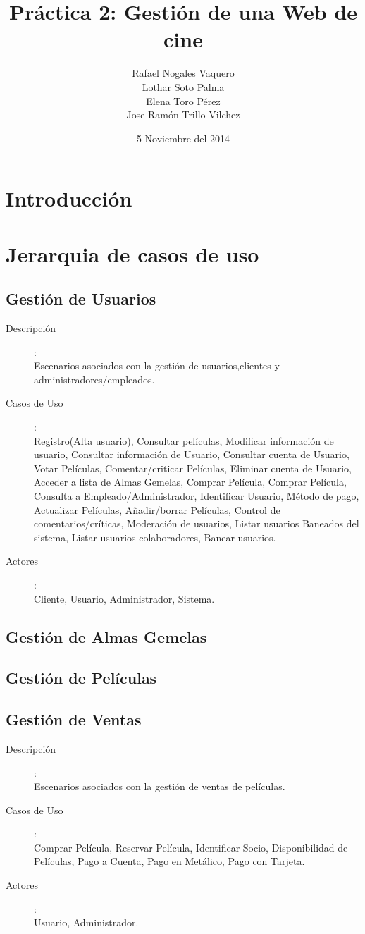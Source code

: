 \documentclass{article}
\title{Práctica 2: Gestión de una Web de cine}
\author{Rafael Nogales Vaquero
\\Lothar Soto Palma
\\Elena Toro Pérez
\\Jose Ramón Trillo Vilchez}
\date{5 Noviembre del 2014}
\begin{document}
\maketitle

\section{Introducción}
\section{Jerarquia de casos de uso}
\subsection*{Gestión de Usuarios}
	\begin{description}
	\item[Descripción]:\\ Escenarios asociados con la gestión de usuarios,clientes y administradores/empleados.
	\item[Casos de Uso]:\\ Registro(Alta usuario), Consultar películas, Modificar información de usuario, Consultar información de Usuario, Consultar cuenta de Usuario, Votar Películas, Comentar/criticar Películas, Eliminar cuenta de Usuario, Acceder a lista de Almas Gemelas, Comprar Película, Comprar Película, Consulta a Empleado/Administrador, Identificar Usuario, Método de pago, Actualizar Películas, Añadir/borrar Películas, Control de comentarios/críticas, Moderación de usuarios, Listar usuarios Baneados del sistema, Listar usuarios colaboradores, Banear usuarios.
	\item[Actores]:\\ Cliente, Usuario, Administrador, Sistema.
	\end{description}
\subsection*{Gestión de Almas Gemelas}
\subsection*{Gestión de Películas}
\subsection*{Gestión de Ventas}
	\begin{description}
	\item[Descripción]:\\ Escenarios asociados con la gestión de ventas de películas.
	\item[Casos de Uso]:\\ Comprar Película, Reservar Película, Identificar Socio, Disponibilidad de Películas, Pago a Cuenta, Pago en Metálico, Pago con Tarjeta.
	\item[Actores]:\\ Usuario, Administrador.
	\end{description}
\end{document}
